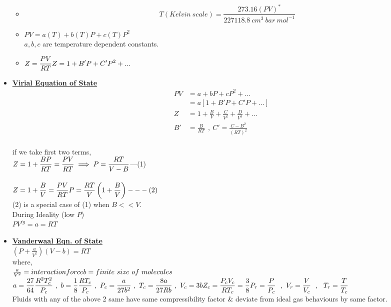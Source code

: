 \documentclass[12pt]{article}
\begin{document}
\begin{itemize}
\begin{tikzpicture}[x=0.75pt,y=0.75pt,yscale=-1,xscale=1]
\end{tikzpicture}\\
		\begin{itemize}
		\item \[T (Kelvin\ scale) = \frac{273.16 (PV)^*}{227118.8\ cm^3\ bar\ mol^{-1}}\]
		\item $PV= a(T)+b(T)P+c(T)P^2$\\
		$a,b,c$ are temperature dependent constants.
		\item $\displaystyle Z=\frac{PV}{RT}\\
		Z= 1+B'P+C'P^2+...$
		\end{itemize}
		\item \textbf{\underline{Virial Equation of State}}\\
		\begin{align}
		 \displaystyle PV &= a+bP+cP^2+...\nonumber \\ 
		 &= a[1+B'P+C'P+...]\nonumber \\
		Z &= 1+\frac{B}{V}+\frac{C}{V^2}+\frac{D}{V^3}+...\nonumber \\
		B' &=\frac{B}{RT}\ \ ,\ C'=\frac{C-B^2}{(RT)^2} \nonumber
		\end{align}\\
		if we take first two terms,\\
		$\displaystyle Z= 1+\frac{BP}{RT}=\frac{PV}{RT}\\\\
		\implies P= \frac{RT}{V-B}$---(1)\\\\
		$\displaystyle Z= 1+ \frac{B}{V} = \frac{PV}{RT}\\\\
		P=\frac{RT}{V}\left(1+\frac{B}{V}\right)---(2)$\\
		(2) is a special case of (1) when $B<<V$.\\
		During Ideality (low $P$)\\
		$PV^{ig}=a=RT$
		\item \textbf{\underline{Vanderwaal Eqn. of State}}\\
		$\displaystyle \left(P+\frac{a}{V^2}\right)\left(V-b\right)=RT$\\
		where,\\
		$\frac{a}{V^2} = interaction force\\
		b= finite\ size\ of\ molecules$\\
		$\displaystyle a=\frac{27}{64}\frac{R^2T_c^2}{P_c} \ , \
		 b=\frac{1}{8}\frac{RT_c}{P_c}\ , \
		 P_c=\frac{a}{27b^2}\ , \
		 T_c=\frac{8a}{27Rb}\  ,\
		 V_c=3b\\
		 Z_c=\frac{P_cV_c}{RT_c}=\frac{3}{8}\\
		 P_r=\frac{P}{P_c}\ \ , \ V_r=\frac{V}{V_c}\ \ , \ \ T_r=\frac{T}{T_c}$\\
		 Fluids with any of the above 2 same have same compressibility factor \& deviate from ideal gas behaviours by same factor.\\
		 


\end{itemize}
\end{document}
